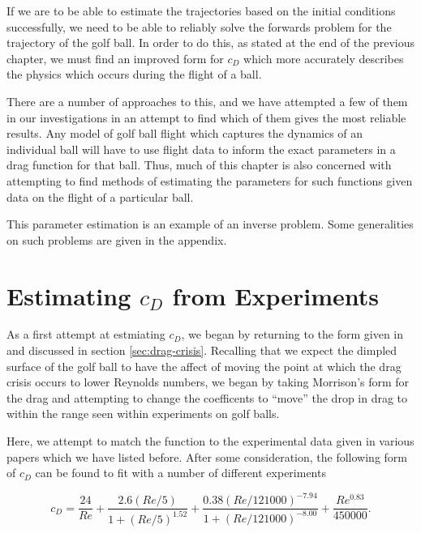 If we are to be able to estimate the trajectories based on the initial conditions successfully, we
need to be able to reliably solve the forwards problem for the trajectory of the golf ball. In order
to do this, as stated at the end of the previous chapter, we must find an improved form for $c_D$ which
more accurately describes the physics which occurs during the flight of a ball.

There are a number of approaches to this, and we have attempted a few of them in our investigations
in an attempt to find which of them gives the most reliable results. Any model of golf ball flight which
captures the dynamics of an individual ball will have to use flight data to inform the exact parameters
in a drag function for that ball. Thus, much of this chapter is also concerned with attempting to find 
methods of estimating the parameters for such functions given data on the flight of a particular ball.

This parameter estimation is an example of an inverse problem. Some generalities on such problems are
given in the appendix.

\section{Estimating $c_{D}$ from Experiments}

As a first attempt at estmiating $c_D$, we began by returning to the form given in \citet{Morrison2010}
and discussed in section \ref{sec:drag-crisis}. Recalling that we expect the dimpled surface of the
golf ball to have the affect of moving the point at which the drag crisis occurs to lower Reynolds
numbers, we began by taking Morrison's form for the drag and attempting to change the coefficents to
``move'' the drop in drag to within the range seen within experiments on golf balls.

Here, we attempt to match the function to the experimental data given in various papers which we
have listed before. After some consideration, the following form of $c_D$ can be found to fit
with a number of different experiments

\begin{equation} \label{drag-m-mod}
c_D = \frac{24}{Re} + \frac{2.6(Re/5)}{1 + (Re/5)^{1.52}} + \frac{0.38(Re/121000)^{-7.94}}{1+(Re/121000)^{-8.00}}
+ \frac{Re^{0.83}}{450000} .
\end{equation}

